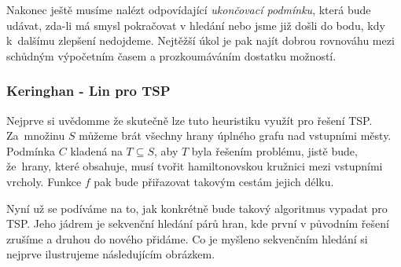 \documentclass[
  printversion=false,
  joinlists=true,
  glossaries=true,
  figures=true,
  tables=true,
  sourcecodes=false,
  theorems=false,
  bibencoding=utf8,
  language=czech,
  encoding=utf8,
  program=infpvs,
  index=true,
  biblatex=true
]{kidiplom}
\begin{document}
Nakonec ještě musíme nalézt odpovídající \textit{ukončovací podmínku}, která bude udávat, zda-li má smysl pokračovat v hledání nebo jsme již došli do bodu, kdy k~dalšímu zlepšení nedojdeme. Nejtěžší úkol je pak najít dobrou rovnováhu mezi schůdným výpočetním časem a prozkoumáváním dostatku možností.

\subsubsection{Keringhan - Lin pro TSP}
Nejprve si uvědomme že skutečně lze tuto heuristiku využít pro řešení TSP. Za~množinu $S$ můžeme brát všechny hrany úplného grafu nad vstupními městy. Podmínka $C$ kladená na $T \subseteq S$, aby $T$ byla řešením problému, jistě bude, že~hrany, které obsahuje, musí tvořit hamiltonovskou kružnici mezi vstupními vrcholy. Funkce $f$ pak bude přiřazovat takovým cestám jejich délku.

Nyní už se podíváme na to, jak konkrétně bude takový algoritmus vypadat pro TSP. Jeho jádrem je sekvenční hledání párů hran, kde první v původním řešení zrušíme a druhou do nového přidáme. Co je myšleno sekvenčním hledání si nejprve ilustrujeme následujícím obrázkem.
\end{document}

